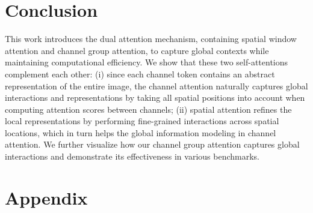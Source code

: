\documentclass[runningheads]{llncs}
\begin{document}
\section{Conclusion}
This work introduces the dual attention mechanism, containing spatial window attention and channel group attention, to capture global contexts while maintaining computational efficiency. 
We show that these two self-attentions complement each other: 
(i) since each channel token contains an abstract representation of the entire image, the channel attention naturally captures global interactions and representations by taking all spatial positions into account when computing attention scores between channels;
(ii) spatial attention refines the local representations by performing fine-grained interactions across spatial locations, which in turn helps the global information modeling in channel attention.
We further visualize how our channel group attention captures global interactions and demonstrate its effectiveness in various benchmarks.






\appendix
\section{Appendix}
\end{document}
